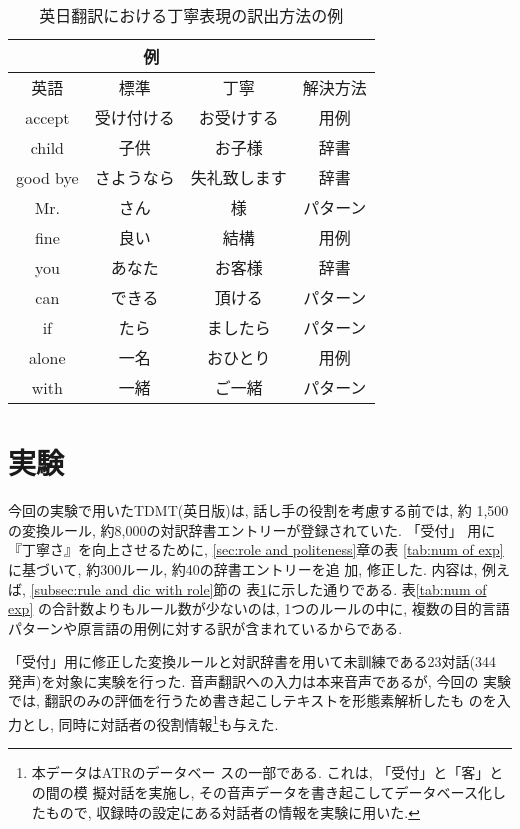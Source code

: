 \tabcolsep=2mm
\begin{table}[htbp]
  \begin{center}
  \caption{英日翻訳における丁寧表現の訳出方法の例}
  \label{tab:solution of exp}
  \begin{tabular}{|c|c|c||c|} \hline
   \multicolumn{3}{|c||}{例} & \\ \hline
    英語 & 標準 & 丁寧 & 解決方法 \\ \hline \hline

    accept & 受け付ける & お受けする & 用例 \\ \hline
    child & 子供 & お子様 & 辞書 \\ \hline
    good bye & さようなら & 失礼致します & 辞書 \\ \hline
    Mr. & さん & 様 & パターン \\ \hline
    fine & 良い & 結構 & 用例 \\ \hline
    you & あなた & お客様 & 辞書 \\ \hline
    can & できる & 頂ける & パターン \\ \hline
    if & たら & ましたら & パターン \\ \hline
    alone & 一名 & おひとり & 用例 \\ \hline
    with & 一緒 & ご一緒 & パターン \\ \hline
  \end{tabular}
\end {center}
\end{table}

\section{実験}

今回の実験で用いたTDMT(英日版)は, 話し手の役割を考慮する前では, 約
1,500の変換ルール, 約8,000の対訳辞書エントリーが登録されていた. 「受付」
用に『丁寧さ』を向上させるために, \ref{sec:role and politeness}章の表
\ref{tab:num of exp}に基づいて, 約300ルール, 約40の辞書エントリーを追
加, 修正した. 内容は, 例えば, \ref{subsec:rule and dic with role}節の
表\ref{tab:solution of exp}に示した通りである. 表\ref{tab:num of exp}
の合計数よりもルール数が少ないのは, 1つのルールの中に, 複数の目的言語
パターンや原言語の用例に対する訳が含まれているからである. 

「受付」用に修正した変換ルールと対訳辞書を用いて未訓練である23対話(344
発声)を対象に実験を行った. 音声翻訳への入力は本来音声であるが, 今回の
実験では, 翻訳のみの評価を行うため書き起こしテキストを形態素解析したも
のを入力とし, 同時に対話者の役割情報\footnote{本データはATRのデータベー
ス\cite{Takezawa:1999}の一部である. これは, 「受付」と「客」との間の模
擬対話を実施し, その音声データを書き起こしてデータベース化したもので, 
収録時の設定にある対話者の情報を実験に用いた.}も与えた.

